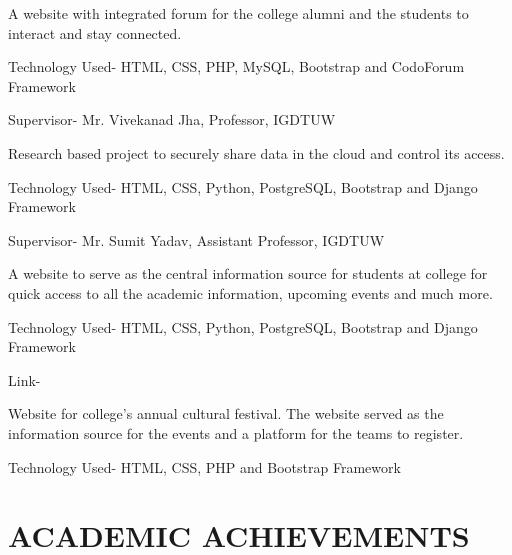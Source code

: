 \documentclass[]{resume-openfont}
\begin{document}
\begin{minipage}[t]{0.68\textwidth}
A website with integrated forum for the college alumni and the students to interact and stay connected.
\begin{tightemize}
\item Technology Used- HTML, CSS, PHP, MySQL, Bootstrap and CodoForum Framework
\item Supervisor- Mr. Vivekanad Jha, Professor, IGDTUW
\end{tightemize}
\sectionsep

Research based project to securely share data in the cloud and control its access.
\begin{tightemize}
\item Technology Used- HTML, CSS, Python, PostgreSQL, Bootstrap and Django Framework
\item Supervisor- Mr. Sumit Yadav, Assistant Professor, IGDTUW
\end{tightemize}
\sectionsep

A website to serve as the central information source for students at college for quick access to all the academic information, upcoming events and much more.
\begin{tightemize}
\item Technology Used- HTML, CSS, Python, PostgreSQL, Bootstrap and Django
Framework
\item Link- \href{http://igdtuwonline.herokuapp.com/}{}
\end{tightemize}
\sectionsep

Website for college’s annual cultural festival. The website served as the information source for the events and a platform for the teams to register. 
\begin{tightemize}
\item Technology Used- HTML, CSS, PHP and Bootstrap Framework
\end{tightemize}

\sectionsep


\section{ACADEMIC ACHIEVEMENTS}


\end{minipage}
\end{document}
